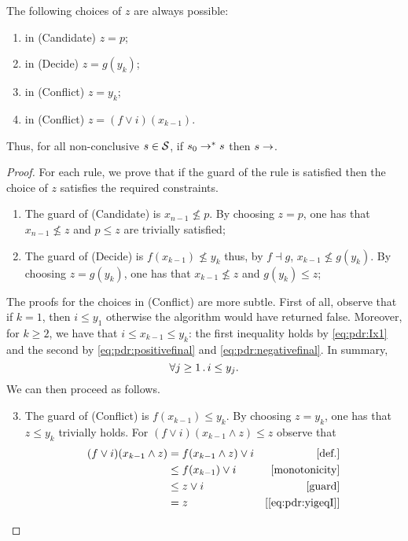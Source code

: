 \begin{prop}\label{prop:pdr:CanonicalChoice}
	The following choices of $z$ are always possible:
	\begin{enumerate}
		\item in (Candidate) $z=p$;
		\item in (Decide) $z= g(y_k)$;
		\item in (Conflict) $z = y_k$;
		\item in (Conflict) $z = (f \lor i)(x_{k-1})$.
	\end{enumerate}
	Thus, for all non-conclusive $s\in \mathcal{S}$, if $s_0 \stackrel{}{\to^*} s $ then $s \stackrel{}{\to}$.
\end{prop}
\begin{proof}
	For each rule, we prove that if the guard of the rule is satisfied then the choice of $z$ satisfies the required constraints.
	\begin{enumerate}
		\item The guard of (Candidate) is $x_{n-1} \not\le p$. By choosing $z=p$, one has that $x_{n-1} \not \le z$ and $p \le z$ are trivially satisfied;
		\item The guard of (Decide) is $f(x_{k-1}) \not\le y_k$ thus, by $f \dashv g$, $x_{k-1} \not \le g(y_k)$. By choosing $z= g(y_k)$, one has that $x_{k-1} \not\le z$ and $g(y_k) \le z$;
	\end{enumerate}
	The proofs for the choices in (Conflict) are more subtle. First of all, observe that if $k=1$, then $i\le y_1$ otherwise the algorithm would have returned false. Moreover, for $k\geq 2$, we have that
	$i \le x_{k-1} \le y_k$: the first inequality holds by \eqref{eq:pdr:Ix1} and the second by \eqref{eq:pdr:positivefinal} and \eqref{eq:pdr:negativefinal}. In summary,
	\begin{equation}\label{eq:pdr:yigeqI}
		\forall j \geq 1 \,.\, i \le y_j \text{.}
	\end{equation}
	We can then proceed as follows.
	\begin{enumerate}\setcounter{enumi}{2}
		\item The guard of (Conflict) is $f(x_{k-1}) \le y_k$. By choosing $z=y_k$, one has that $z \le y_k$ trivially holds. For $(f \lor i)(x_{k-1} \land z) \le z$ observe that
		      \begin{align*}
			      (f \lor i)(x_{k-1} \land z) & = f(x_{k-1} \land z) \lor i & [\text{def.}]           \\
			                                  & \le f(x_{k-1} ) \lor i      & [\text{monotonicity}]   \\
			                                  & \le z \lor i                & [\text{guard}]          \\
			                                  & = z                         & [\eqref{eq:pdr:yigeqI}]
		      \end{align*}


\end{enumerate}
\end{proof}
